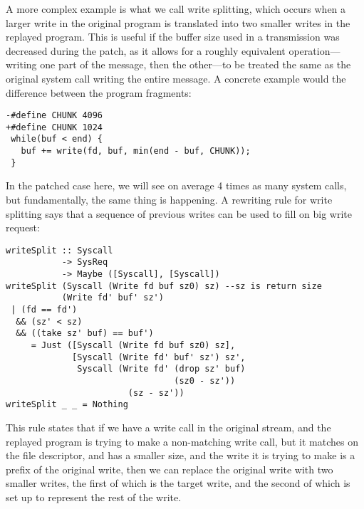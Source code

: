 

A more complex example is what we call write splitting, which occurs
when a larger write in the original program is translated into two smaller writes in the
replayed program. This is useful if the buffer size used in a
transmission was decreased during the patch, as it allows for a roughly
equivalent operation---writing one part of the message, then the other---to
be treated the same as the original system call writing the entire
message. A concrete example would the difference between the program fragments:
\begin{lstlisting}
-#define CHUNK 4096
+#define CHUNK 1024
 while(buf < end) {
   buf += write(fd, buf, min(end - buf, CHUNK));
 }
\end{lstlisting}

In the patched case here, we will see on average 4 times as many
system calls, but fundamentally, the same thing is happening. A
rewriting rule for write splitting says that a sequence of previous
writes can be used to fill on big write request:
\lstset{language=Haskell}
\begin{lstlisting}
writeSplit :: Syscall
           -> SysReq
           -> Maybe ([Syscall], [Syscall])
writeSplit (Syscall (Write fd buf sz0) sz) --sz is return size
           (Write fd' buf' sz')
 | (fd == fd')
  && (sz' < sz)
  && ((take sz' buf) == buf')
     = Just ([Syscall (Write fd buf sz0) sz],
             [Syscall (Write fd' buf' sz') sz',
              Syscall (Write fd' (drop sz' buf)
                                 (sz0 - sz'))
                        (sz - sz'))
writeSplit _ _ = Nothing
\end{lstlisting}

This rule states that if we have a write call in the original
stream, and the replayed program is trying to make a non-matching
write call, but it matches on the file descriptor, and has a smaller
size, and the write it is trying to make is a prefix of the original
write, then we can replace the original write with two smaller writes,
the first of which is the target write, and the second of which is set
up to represent the rest of the write.

